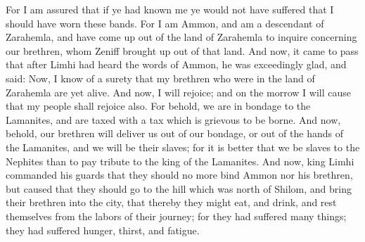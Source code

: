 \bverse \iffalse For I am assured that if ye had known me ye would not have suffered that I should have worn these bands. For I am Ammon, and am a descendant of Zarahemla, and have come up out of the land of Zarahemla to inquire concerning our brethren, whom Zeniff brought up out of that land. \fi
For I am assured that if ye had known me ye would not have suffered that I should have worn these bands. For I am Ammon, and am a descendant of Zarahemla, and have come up out of the land of Zarahemla to inquire concerning our brethren, whom Zeniff brought up out of that land.
\bverse \iffalse And now, it came to pass that after Limhi had heard the words of Ammon, he was exceedingly glad, and said: Now, I know of a surety that my brethren who were in the land of Zarahemla are yet alive. And now, I will rejoice; and on the morrow I will cause that my people shall rejoice also. \fi
And now, it came to pass that after Limhi had heard the words of Ammon, he was exceedingly glad, and said: Now, I know of a surety that my brethren who were in the land of Zarahemla are yet alive. And now, I will rejoice; and on the morrow I will cause that my people shall rejoice also.
\bverse \iffalse For behold, we are in bondage to the Lamanites, and are taxed with a tax which is grievous to be borne. And now, behold, our brethren will deliver us out of our bondage, or out of the hands of the Lamanites, and we will be their slaves; for it is better that we be slaves to the Nephites than to pay tribute to the king of the Lamanites. \fi
For behold, we are in bondage to the Lamanites, and are taxed with a tax which is grievous to be borne. And now, behold, our brethren will deliver us out of our bondage, or out of the hands of the Lamanites, and we will be their slaves; for it is better that we be slaves to the Nephites than to pay tribute to the king of the Lamanites.
\bverse \iffalse And now, king Limhi commanded his guards that they should no more bind Ammon nor his brethren, but caused that they should go to the hill which was north of Shilom, and bring their brethren into the city, that thereby they might eat, and drink, and rest themselves from the labors of their journey; for they had suffered many things; they had suffered hunger, thirst, and fatigue. \fi
And now, king Limhi commanded his guards that they should no more bind Ammon nor his brethren, but caused that they should go to the hill which was north of Shilom, and bring their brethren into the city, that thereby they might eat, and drink, and rest themselves from the labors of their journey; for they had suffered many things; they had suffered hunger, thirst, and fatigue.
